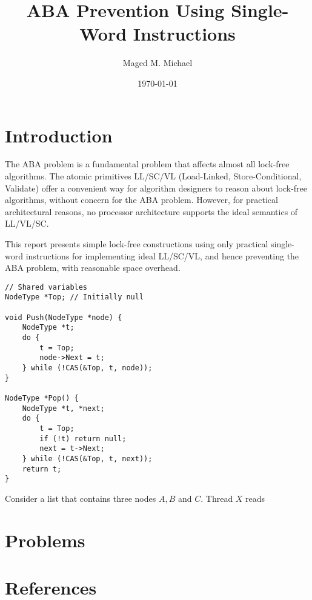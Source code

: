 \documentclass[11pt]{article}
\author{Maged M. Michael}
\date{\today}
\title{ABA Prevention Using Single-Word Instructions}
\begin{document}
\maketitle
\section{Introduction}
\label{sec:orgf517764}
The ABA problem is a fundamental problem that affects almost all lock-free algorithms. The atomic
primitives LL/SC/VL (Load-Linked, Store-Conditional, Validate) oﬀer a convenient way for algorithm
designers to reason about lock-free algorithms, without concern for the ABA problem. However, for
practical architectural reasons, no processor architecture supports the ideal semantics of LL/VL/SC.

This report presents simple lock-free constructions using only practical single-word instructions for
implementing ideal LL/SC/VL, and hence preventing the ABA problem, with reasonable space overhead.

\begin{verbatim}
// Shared variables
NodeType *Top; // Initially null

void Push(NodeType *node) {
    NodeType *t;
    do {
        t = Top;
        node->Next = t;
    } while (!CAS(&Top, t, node));
}

NodeType *Pop() {
    NodeType *t, *next;
    do {
        t = Top;
        if (!t) return null;
        next = t->Next;
    } while (!CAS(&Top, t, next));
    return t;
}
\end{verbatim}
Consider a list that contains three nodes \(A, B\) and \(C\). Thread \(X\) reads
\section{Problems}
\label{sec:org8b1b949}


\section{References}
\label{sec:org9de86cb}
\label{bibliographystyle link}


\label{bibliography link}

\end{document}
